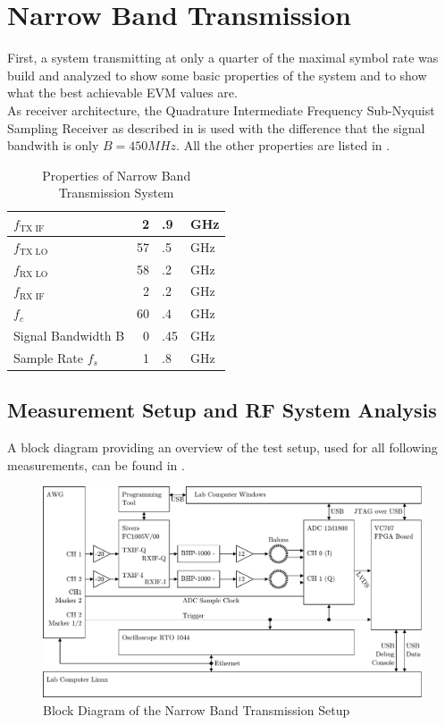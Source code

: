 \chapter{Narrow Band Transmission}
\label{chap:res_450}
First, a system transmitting at only a quarter of the maximal symbol rate
was build and analyzed to show some basic properties of the system and
to show what the best achievable \gls{EVM} values are. \\

As receiver architecture, the Quadrature Intermediate Frequency Sub-Nyquist
Sampling Receiver as described in  is used with the difference
that the signal bandwith is only $B = 450 MHz$. All the other properties are listed
in . \\

\begin{table}[h]
  \centering
  \begin{tabular}{|l|r@{}l@{~}l|}
    \hline
    $f_{\text{TX IF}}$ & 2&.9&GHz \\ \hline
    $f_{\text{TX LO}}$ & 57&.5&GHz \\ \hline
    $f_{\text{RX LO}}$ & 58&.2&GHz \\ \hline
    $f_{\text{RX IF}}$ & 2&.2&GHz \\ \hline
    $f_c$            & 60&.4&GHz \\ \hline
    Signal Bandwidth B & 0&.45&GHz \\ \hline
    Sample Rate $f_s$ & 1&.8&GHz \\ \hline
  \end{tabular}
  \caption{Properties of Narrow Band Transmission System}
  \label{tab:res_450}
\end{table}

\section{Measurement Setup and RF System Analysis}

A block diagram providing an overview of the test setup,
used for all following measurements, can be found in . \\

\begin{figure}[p]
  \centering
  \includegraphics[width=\textwidth]{figures/res_450_setup}
  \caption{Block Diagram of the Narrow Band Transmission Setup}
  \label{fig:res_450_bd}
\end{figure}

